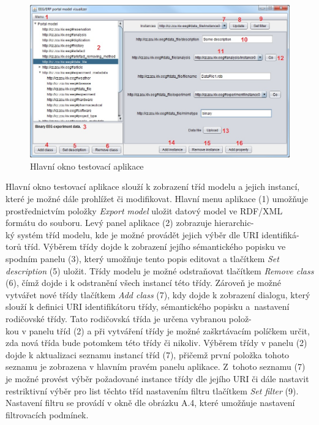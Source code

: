 \documentclass{projekt}
\begin{document}
\begin{figure}[htb!]
\begin{center}
\includegraphics[scale=0.57]{manualTestMain.jpg}
\caption{Hlavní okno testovací aplikace}
\end{center}
\end{figure}

\thispagestyle{plain}
Hlavní okno testovací aplikace slouží k zobrazení tříd modelu a jejich instancí, které je možné dále prohlížet či modifikovat. Hlavní menu aplikace (1) umožňuje prostřednictvím položky {\it Export model} uložit datový model ve RDF/XML formátu do souboru. Levý panel aplikace (2) zobrazuje hierarchic-\\ký systém tříd modelu, kde je možné provádět jejich výběr dle URI identifiká-\\torů tříd. Výběrem třídy dojde k zobrazení jejího sémantického popisku ve spodním panelu (3), který umožňuje tento popis editovat a tlačítkem {\it Set description} (5) uložit. Třídy modelu je možné odstraňovat tlačítkem {\it Remove class} (6), čímž dojde i k odstranění všech instancí této třídy. Zároveň je možné vytvářet nové třídy tlačítkem {\it Add class} (7), kdy dojde k zobrazení dialogu, který slouží k definici URI identifikátoru třídy, sémantického popisku a~nastavení rodičovské třídy. Tato rodičovská třída je určena vybranou polož-\\kou v panelu tříd (2) a při vytváření třídy je možné zaškrtávacím políčkem určit, zda nová třída bude potomkem této třídy či nikoliv. Výběrem třídy v panelu (2) dojde k aktualizaci seznamu instancí tříd (7), přičemž první položka tohoto seznamu je zobrazena v hlavním pravém panelu aplikace. Z~tohoto seznamu (7) je možné provést výběr požadované instance třídy dle jejího URI či dále nastavit restriktivní výběr pro list těchto tříd nastavením filtru tlačítkem {\it Set filter} (9). Nastavení filtru se provádí v okně dle obrázku A.4, které umožňuje nastavení filtrovacích podmínek.
\end{document}
